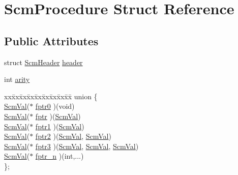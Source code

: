 \hypertarget{struct_scm_procedure}{\section{Scm\-Procedure Struct Reference}
\label{struct_scm_procedure}
}
\subsection*{Public Attributes}
\begin{DoxyCompactItemize}
\item 
struct \hyperlink{struct_scm_header}{Scm\-Header} \hyperlink{struct_scm_procedure_a5a8d7e8f7f57fd1418dd19c2dc3133ec}{header}
\item 
int \hyperlink{struct_scm_procedure_adf8e6456c1100c93597a9c3e3184a1f5}{arity}
\item 
\begin{tabbing}
xx\=xx\=xx\=xx\=xx\=xx\=xx\=xx\=xx\=\kill
union \{\\
\>\hyperlink{eva_8h_a9e754b130d398cb7a4000c8c7a046427}{ScmVal}($\ast$ \hyperlink{struct_scm_procedure_a237b3cabee0b62a1379614f314b80b89}{fptr0} )(void)\\
\>\hyperlink{eva_8h_a9e754b130d398cb7a4000c8c7a046427}{ScmVal}($\ast$ \hyperlink{struct_scm_procedure_a9a14e2dfb4e36b531852d0f263f0c98a}{fptr} )(\hyperlink{eva_8h_a9e754b130d398cb7a4000c8c7a046427}{ScmVal})\\
\>\hyperlink{eva_8h_a9e754b130d398cb7a4000c8c7a046427}{ScmVal}($\ast$ \hyperlink{struct_scm_procedure_a1451b1a1d4468548150a9a5fe47322cc}{fptr1} )(\hyperlink{eva_8h_a9e754b130d398cb7a4000c8c7a046427}{ScmVal})\\
\>\hyperlink{eva_8h_a9e754b130d398cb7a4000c8c7a046427}{ScmVal}($\ast$ \hyperlink{struct_scm_procedure_a565e6016515f88f369e8855258c9ef75}{fptr2} )(\hyperlink{eva_8h_a9e754b130d398cb7a4000c8c7a046427}{ScmVal}, \hyperlink{eva_8h_a9e754b130d398cb7a4000c8c7a046427}{ScmVal})\\
\>\hyperlink{eva_8h_a9e754b130d398cb7a4000c8c7a046427}{ScmVal}($\ast$ \hyperlink{struct_scm_procedure_aed3dde4b5c3dd26d9405c8ce514a41e7}{fptr3} )(\hyperlink{eva_8h_a9e754b130d398cb7a4000c8c7a046427}{ScmVal}, \hyperlink{eva_8h_a9e754b130d398cb7a4000c8c7a046427}{ScmVal}, \hyperlink{eva_8h_a9e754b130d398cb7a4000c8c7a046427}{ScmVal})\\
\>\hyperlink{eva_8h_a9e754b130d398cb7a4000c8c7a046427}{ScmVal}($\ast$ \hyperlink{struct_scm_procedure_a3f92e3a96c417b46f78ab5c9af992065}{fptr\_n} )(int,...)\\
\}; \\

\end{tabbing}\end{DoxyCompactItemize}



